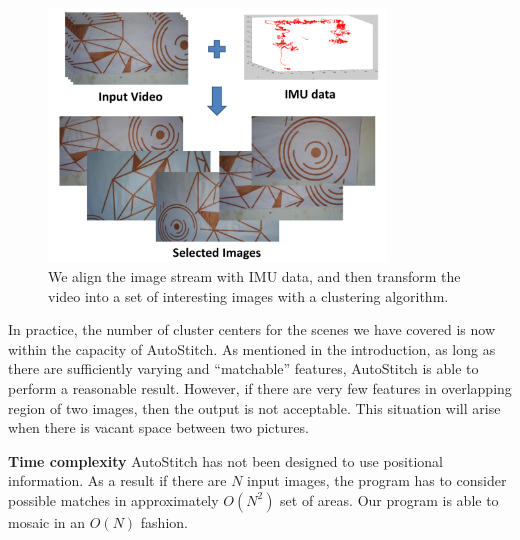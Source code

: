 
\begin{figure}[t!]
  \centering
  \includegraphics[width=0.8\textwidth]{figures/selection} 
  \caption[Selection of Images]{ \label{fig:selection} We align the image stream
  with IMU data, and then transform the video into a set of interesting
    images with a clustering algorithm.}
\end{figure}    

In practice, the number of cluster centers for the scenes we have
covered is now within the capacity of AutoStitch.  As mentioned in the
introduction, as long as there are sufficiently varying and
``matchable'' features, AutoStitch is able to perform a reasonable
result.  However, if there are very few features in overlapping region
of two images, then the output is not acceptable. This situation will
arise when there is vacant space between two pictures.

{\bf Time complexity} AutoStitch has not been designed
to use positional information. As a result if there are $N$ input
images, the program has to consider possible matches in approximately
$O(N^2)$ set of areas.  Our program is able to mosaic in an $O(N)$
fashion.

